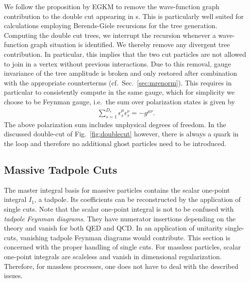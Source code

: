 We follow the proposition by EGKM \cite{Ellis:2008ir}
to remove the wave-function graph contribution to the double cut
appearing in \olb s. This is particularly well suited for
calculations employing Berends-Giele recursions for the tree
generation. Computing the double cut trees, we interrupt the recursion
whenever a wave-function graph situation is identified. We thereby
remove any divergent tree contribution. In particular, this implies
that the two cut particles are not allowed to join in a vertex without
previous interactions. Due to this
removal, gauge invariance of the tree amplitude is broken and only restored
after combination with the appropriate counterterms (cf.~Sec.~\ref{sec:mrenorm}). This requires in
particular to consistently compute in the same gauge, which for simplicity we choose to be Feynman gauge, i.e.\ the sum over polarization states is given by
\begin{align}\label{eq:gluonpolsum}
  \sum_{s=1}^{D_s}\epsilon_s^\mu\epsilon_s^\nu = - g^{\mu\nu}.
\end{align}
The above polarization sum includes unphysical degrees of
freedom. In the discussed double-cut of Fig.~\ref{fig:doublecut} however, there is always a quark
in the loop and therefore no additional ghost particles need to be introduced.

\subsection{Massive Tadpole Cuts}
\label{sec:massivetadpoles}
The master integral basis for massive particles contains the scalar
one-point integral $I_1$, a tadpole. Its coefficients can be reconstructed by the application of single
cuts. Note that the scalar one-point integral is not to be confused with
\textit{tadpole Feynman diagrams}. They have numerator insertions depending on
the theory and vanish for both QED and QCD. In an application of
unitarity single-cuts, vanishing tadpole Feynman diagrams would contribute. This section is concerned with the proper handling of
single cuts. For massless particles, scalar one-point integrals are scaleless and vanish in dimensional
regularization. Therefore, for massless processes, one does not have
to deal with the described issues.

